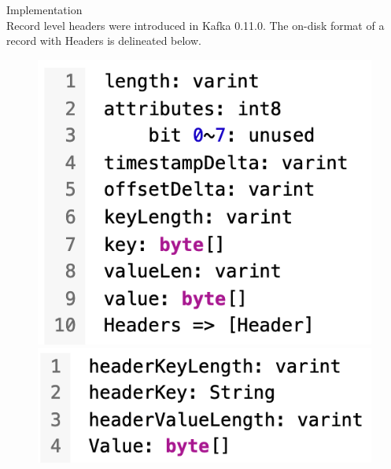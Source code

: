 \begin{frame}[plain,t]{Implementation} %
     \\
    \vspace{2ex}
    Record level headers were introduced in Kafka 0.11.0. The on-disk format of a record with Headers is delineated below.
    
    \vspace{2ex}
    \begin{figure}[htbp]
        \centering
        \begin{minipage}[t]{0.48\textwidth}
            \centering
                    \includegraphics[width=0.8\linewidth]{image/0303}
        \end{minipage}
        \begin{minipage}[t]{0.48\textwidth}
            \centering
                \includegraphics[width=0.8\linewidth]{image/0304}
        \end{minipage}
    \end{figure}
    
   
  
    
\end{frame}
